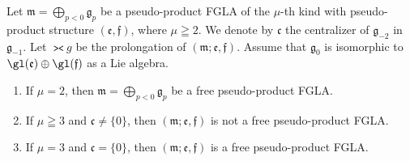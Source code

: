 \begin{proposition}\label{prop8.4}
Let $\mathfrak m=\bigoplus\limits_{p<0}\mathfrak g_p$ be a
pseudo-product FGLA of the $\mu$-th kind with
pseudo-product structure $(\mathfrak e,\mathfrak f)$, where $\mu\geqq2$.
We denote by $\mathfrak c$
the centralizer of $\mathfrak g_{-2}$ in $\mathfrak g_{-1}$.
Let $\gla g$ be the prolongation of $(\mathfrak m;\mathfrak e,\mathfrak f)$.
Assume that $\mathfrak g_0$ is isomorphic to $\gl(\mathfrak e)\oplus\gl(\mathfrak f)$ as a Lie algebra.
\begin{enumerate}\itemsep=0pt
\item If $\mu=2$, then $\mathfrak m=\bigoplus\limits_{p<0}\mathfrak g_p$
be a free
pseudo-product FGLA.
\item If $\mu\geqq3$ and $\mathfrak c\ne\{0\}$,
then $(\mathfrak m;\mathfrak e,\mathfrak f)$ is not a free pseudo-product
FGLA.
\item If $\mu=3$ and $\mathfrak c=\{0\}$,
then $(\mathfrak m;\mathfrak e,\mathfrak f)$ is a free pseudo-product
FGLA.
\end{enumerate}
\end{proposition}

